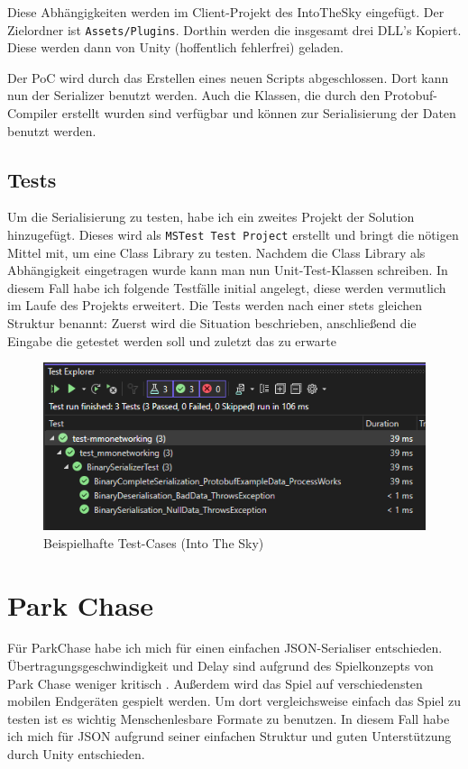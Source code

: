 Diese Abhängigkeiten werden im Client-Projekt des IntoTheSky eingefügt. Der Zielordner ist \verb|Assets/Plugins|. Dorthin werden die insgesamt drei DLL's Kopiert. Diese werden dann von Unity (hoffentlich fehlerfrei) geladen.

Der PoC wird durch das Erstellen eines neuen Scripts abgeschlossen. Dort kann nun der Serializer benutzt werden. Auch die Klassen, die durch den Protobuf-Compiler erstellt wurden sind verfügbar und können zur Serialisierung der Daten benutzt werden.


\subsection{Tests}

Um die Serialisierung zu testen, habe ich ein zweites Projekt der Solution hinzugefügt. Dieses wird als \verb|MSTest Test Project| erstellt und bringt die nötigen Mittel mit, um eine Class Library zu testen. Nachdem die Class Library als Abhängigkeit eingetragen wurde kann man nun Unit-Test-Klassen schreiben. In diesem Fall habe ich folgende Testfälle initial angelegt, diese werden vermutlich im Laufe des Projekts erweitert. Die Tests werden nach einer stets gleichen Struktur benannt: Zuerst wird die Situation beschrieben, anschließend die Eingabe die getestet werden soll und zuletzt das zu erwarte

\begin{figure}[!h]
	\centering
	\includegraphics[width=16cm]{figures/intotheskytests.png}
	\caption{Beispielhafte Test-Cases (Into The Sky)}
	\label{fig:networkingstructure}
\end{figure}

\section{Park Chase}

Für ParkChase habe ich mich für einen einfachen JSON-Serialiser entschieden. Übertragungsgeschwindigkeit und Delay sind aufgrund des Spielkonzepts von Park Chase weniger kritisch . Außerdem wird das Spiel auf verschiedensten mobilen Endgeräten gespielt werden. Um dort vergleichsweise einfach das Spiel zu testen ist es wichtig Menschenlesbare Formate zu benutzen. In diesem Fall habe ich mich für JSON aufgrund seiner einfachen Struktur und guten Unterstützung durch Unity entschieden.

